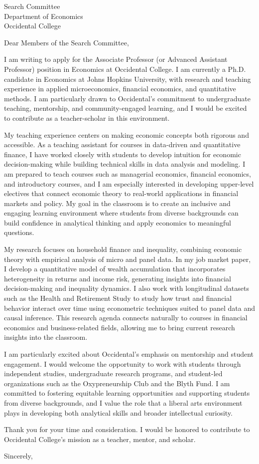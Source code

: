 \documentclass[11pt]{letter}
\begin{document}
\begin{letter}{Search Committee \\
Department of Economics \\
Occidental College}

\opening{Dear Members of the Search Committee,}

I am writing to apply for the Associate Professor (or Advanced Assistant Professor) position in Economics at Occidental College. I am currently a Ph.D. candidate in Economics at Johns Hopkins University, with research and teaching experience in applied microeconomics, financial economics, and quantitative methods. I am particularly drawn to Occidental’s commitment to undergraduate teaching, mentorship, and community-engaged learning, and I would be excited to contribute as a teacher-scholar in this environment.

My teaching experience centers on making economic concepts both rigorous and accessible. As a teaching assistant for courses in data-driven and quantitative finance, I have worked closely with students to develop intuition for economic decision-making while building technical skills in data analysis and modeling. I am prepared to teach courses such as managerial economics, financial economics, and introductory courses, and I am especially interested in developing upper-level electives that connect economic theory to real-world applications in financial markets and policy. My goal in the classroom is to create an inclusive and engaging learning environment where students from diverse backgrounds can build confidence in analytical thinking and apply economics to meaningful questions.

My research focuses on household finance and inequality, combining economic theory with empirical analysis of micro and panel data. In my job market paper, I develop a quantitative model of wealth accumulation that incorporates heterogeneity in returns and income risk, generating insights into financial decision-making and inequality dynamics. I also work with longitudinal datasets such as the Health and Retirement Study to study how trust and financial behavior interact over time using econometric techniques suited to panel data and causal inference. This research agenda connects naturally to courses in financial economics and business-related fields, allowing me to bring current research insights into the classroom.

I am particularly excited about Occidental’s emphasis on mentorship and student engagement. I would welcome the opportunity to work with students through independent studies, undergraduate research programs, and student-led organizations such as the Oxypreneurship Club and the Blyth Fund. I am committed to fostering equitable learning opportunities and supporting students from diverse backgrounds, and I value the role that a liberal arts environment plays in developing both analytical skills and broader intellectual curiosity.

Thank you for your time and consideration. I would be honored to contribute to Occidental College’s mission as a teacher, mentor, and scholar.

\closing{Sincerely,}

\end{letter}
\end{document}
